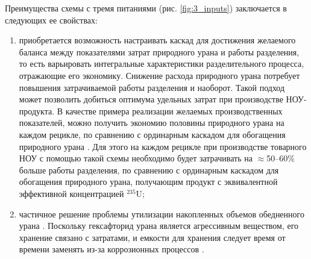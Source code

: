 
Преимущества схемы с тремя питаниями (рис. \ref{fig:3_inputs}) заключается в следующих ее свойствах:

\begin{enumerate}
  \item приобретается возможность настраивать каскад для достижения желаемого баланса между показателями затрат природного урана и работы разделения, то есть варьировать интегральные характеристики разделительного процесса, отражающие его экономику. Снижение расхода природного урана потребует повышения затрачиваемой работы разделения и наоборот. Такой подход может позволить добиться оптимума удельных затрат при производстве НОУ-продукта. В качестве примера реализации желаемых производственных показателей, можно получить экономию половины природного урана на каждом рецикле, по сравнению с ординарным каскадом для обогащения природного урана   \cite{smirnovApplyingEnrichmentCapacities2018}. Для этого на каждом рецикле при производстве товарного НОУ с помощью такой схемы необходимо будет затрачивать на $\approx$50--60\% больше работы разделения, по сравнению с ординарным каскадом для обогащения природного урана, получающим продукт с эквивалентной эффективной концентрацией $^{235}$U;
  \item частичное решение проблемы утилизации накопленных объемов обедненного урана \cite{smirnovEnrichmentRegeneratedUranium2014}. Поскольку гексафторид урана является агрессивным веществом, его хранение связано с затратами, и емкости для хранения следует время от времени заменять из-за коррозионных процессов \cite{fitchOPTIONSDISPOSALREAPPLICATION2009, oecdManagementDepletedUranium2001}.
\end{enumerate}

